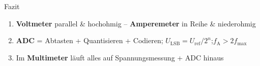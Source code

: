 \documentclass[aspectratio=169,11pt]{beamer}
\newif\ifkurzfassung
\newcommand{\kernaussage}[1]{%
  \begin{beamercolorbox}[sep=6pt,rounded=true]{block body}%
  \textbf{#1}\end{beamercolorbox}}
\newcommand{\folieMessbereich}{%
\begin{frame}{Messbereichserweiterung}
  \kernaussage{Vorwiderstand (Voltmeter) bzw. Shunt (Amperemeter) erweitern den Messbereich.}
  \vspace{2mm}
  \begin{columns}[T]
    \column{0.48\textwidth}
    \centering\textbf{Voltmeter: $R_V$ in Reihe}\\[1mm]
    \begin{circuitikz}[scale=0.75,transform shape]
      \draw (0,0) to[R,l=$R_V$,o-] (2.5,0) to[voltmeter,l=$R_i$,-o] (5,0);
    \end{circuitikz}\\[1mm]
    $R_V = (n-1)\cdot R_i$
    \column{0.48\textwidth}
    \centering\textbf{Amperemeter: $R_N$ parallel}\\[1mm]
    \begin{circuitikz}[scale=0.75,transform shape]
      \draw (0,0) to[short,o-] (1,0) to[ammeter,l=$R_i$] (4,0) to[short,-o] (5,0);
      \draw (1,0) -- (1,-1.3) to[R,l_=$R_N$] (4,-1.3) -- (4,0);
    \end{circuitikz}\\[1mm]
    $R_N = \dfrac{R_i}{n-1}$
  \end{columns}
  \vspace{3mm}
  \small Messwerk: \SI{100}{\micro\ampere} Vollausschlag, $R_i=\SI{1}{\kilo\ohm}$, $n=100$:\quad
  \\[1mm]
  \SI{10}{\volt}-Bereich $\Rightarrow R_V=\SI{99}{\kilo\ohm}$ \qquad
  \SI{10}{\milli\ampere}-Bereich $\Rightarrow R_N\approx\SI{10.1}{\ohm}$
  \note{Vorwiderstand übernimmt den Großteil der Spannung, Shunt den Großteil des Stroms.
  Beispiel: 100 µA / 1 kΩ soll 10 V messen: Faktor 100, also 99 kΩ.}
\end{frame}}
\newcommand{\folieRichtig}{%
\begin{frame}{Spannungsrichtige vs.\ stromrichtige Messung}
  \kernaussage{Wer U und I gleichzeitig misst, verfälscht immer einen der beiden Werte.}
  \begin{columns}[T]
    \column{0.48\textwidth}\centering
    \textbf{Spannungsrichtig}\\[1mm]
    \begin{circuitikz}[scale=0.7,transform shape]
      \draw (0,0) to[ammeter] (2.5,0) -- (4,0) to[R,l=$R$] (4,-2.5) -- (0,-2.5);
      \draw (2.8,0) to[voltmeter] (2.8,-2.5);
      \draw (0,0) to[battery1] (0,-2.5);
    \end{circuitikz}\\
    \small U korrekt, I zu groß\\ $\Rightarrow$ für \textbf{kleine} $R$
    \column{0.48\textwidth}\centering
    \textbf{Stromrichtig}\\[1mm]
    \begin{circuitikz}[scale=0.7,transform shape]
      \draw (0,0) -- (1,0) to[ammeter] (3.5,0) -- (4,0) to[R,l=$R$] (4,-2.5) -- (0,-2.5);
      \draw (1,0) to[voltmeter] (1,-2.5);
      \draw (0,0) to[battery1] (0,-2.5);
    \end{circuitikz}\\
    \small I korrekt, U zu groß\\ $\Rightarrow$ für \textbf{große} $R$
  \end{columns}
  \note{Faustregel: kleine Widerstände spannungsrichtig, große Widerstände stromrichtig.}
\end{frame}}
\newcommand{\folieSAR}{%
\begin{frame}{SAR-Wandler Schritt für Schritt}
  \kernaussage{Wie beim Zahlenraten: jeder Schritt halbiert den Suchbereich.}
  \small 4 Bit, $U_\text{ref}=\SI{16}{\volt}$ ($\Rightarrow$ 1\,LSB $=\SI{1}{\volt}$), $U_\text{ein}=\SI{11.3}{\volt}$\\[2mm]
  \centering
  \begin{tabular}{clccc}
    \toprule
    Schritt & Bit testen & Vergleich & $\le \SI{11.3}{\volt}$? & Bit \\
    \midrule
    1 & MSB (8) & \SI{8}{\volt}            & ja   & \textbf{1}\\ \pause
    2 & 4       & $8+4=\SI{12}{\volt}$     & nein & \textbf{0}\\ \pause
    3 & 2       & $8+2=\SI{10}{\volt}$     & ja   & \textbf{1}\\ \pause
    4 & LSB (1) & $10+1=\SI{11}{\volt}$    & ja   & \textbf{1}\\
    \bottomrule
  \end{tabular}\\[3mm] \pause
  Ergebnis: $\mathbf{1011_2 = 11}$ $\Rightarrow$ \SI{11}{\volt} \quad (Rest \SI{0.3}{\volt} $<$ 1\,LSB = Quantisierungsfehler)
  \note{n Bit brauchen genau n Vergleichsschritte -- deshalb schnell genug für Mikrocontroller.}
\end{frame}}
\begin{document}
\begin{frame}{Fazit}
  \begin{enumerate}
    \setlength{\itemsep}{4mm}
    \item \textbf{Voltmeter} parallel \& hochohmig -- \textbf{Amperemeter} in Reihe \& niederohmig
    \item \textbf{ADC} = Abtasten + Quantisieren + Codieren;\quad
          $U_\text{LSB}=U_\text{ref}/2^n$;\quad $f_\text{A}>2f_\text{max}$
    \item Im \textbf{Multimeter} läuft alles auf Spannungsmessung + ADC hinaus
  \end{enumerate}
  \vspace{8mm}
\end{frame}

\ifkurzfassung
  \appendix
  \begin{frame}[plain]\centering\vfill{\Large\color{grau}Backup}\vfill\end{frame}
  \folieMessbereich
  \folieRichtig
  \folieSAR
\fi
\end{document}

